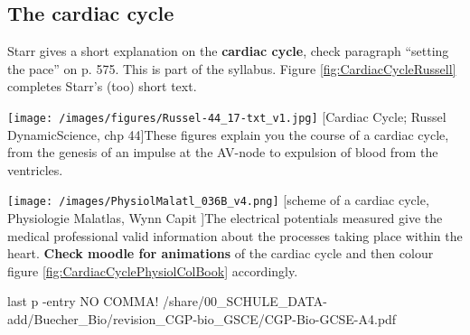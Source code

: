 \areaset[0cm]{16cm}{26.5cm}
\subsection{The cardiac cycle}
\enlargethispage{2.6cm} \thispagestyle{empty}

				\begin{mdframed}[style=exampledefault, userdefinedwidth=16cm,frametitle={Starr Chapter 33.3}\label{mat:Starr-33.3_CardiacCycle}]
			Starr gives a short explanation on the \textbf{cardiac cycle}, check  paragraph ``setting the pace'' on p. 575. This is part of the syllabus. Figure \ref{fig:CardiacCycleRussell} completes Starr's (too) short text.
		\end{mdframed}

%
\begin{minipage}{16cm} \hspace{-2cm}
		  \texttt{[image: /images/figures/Russel-44\_17-txt\_v1.jpg]}
		  [Cardiac Cycle; Russel DynamicScience, chp 44]{These figures explain you the course of a cardiac cycle, from the genesis of an impulse at the AV-node to expulsion of blood from the ventricles. }
		  \label{fig:CardiacCycleRussell}
\end{minipage}




	\begin{minipage}{16cm}
	\centering
		\texttt{[image: /images/PhysiolMalatl\_036B\_v4.png]}
		[scheme of a cardiac cycle, Physiologie Malatlas, Wynn Capit ]{The electrical potentials measured give the medical professional valid information about the processes taking place within the heart. \textbf{Check moodle for animations} of the cardiac cycle and then colour figure \ref{fig:CardiacCyclePhysiolColBook} accordingly.}
		\label{fig:CardiacCyclePhysiolColBook}
			\end{minipage}


 last p -entry NO COMMA!
     {/share/00_SCHULE_DATA-add/Buecher_Bio/revision_CGP-bio_GSCE/CGP-Bio-GCSE-A4.pdf}

